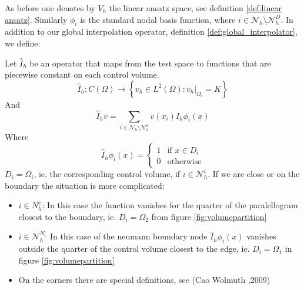 \documentclass[../Main/main.tex]{subfiles}
\begin{document}
	\par 
	As before one denotes by $V_h$ the linear ansatz space, see definition \ref{def:linear ansatz}. Similarly $\phi_i$ is the standard nodal basis function, where $i \in \mathcal{N}_h \setminus \mathcal{N}_h^D$.
	In addition to our global interpolation operator, definition \ref{def:global_interpolator}, we define:
	\begin{definition}
		Let $\hat{I}_h$ be an operator that maps from the test space to functions that are piecewise constant on each control volume.
		\begin{equation*}
			\hat{I}_h:C(\Omega)\rightarrow \left \{ v_h \in L^2(\Omega):v_h|_{\Omega_i} = K \right \}
		\end{equation*}
		And
		\begin{equation*}
			\hat{I}_h v = \sum_{i\in \mathcal{N}_h\setminus\mathcal{N}_h^d}v(x_i)\hat{I}_h\phi_i(x)
		\end{equation*}
		Where
		\begin{equation}
			\hat{I}_h\phi_i(x)=\left\{\begin{matrix}
				1 & \text{if } x\in D_i\\ 
				0 & \text{otherwise}
			\end{matrix}\right.
		\end{equation}
		$D_i = \Omega_i$, ie. the corresponding control volume, if $i \in \mathcal{N}_h^i$. If we are close or on the boundary the situation is more complicated: 
		\begin{itemize}
			\item $i \in N_h^e$: In this case the function vanishes for the quarter of the paralellogram closest to the boundary, ie. $D_i = \Omega_2$ from figure \ref{fig:volumepartition}
			\item $i \in \mathcal{N}_h^{N_e}$ In this case of the neumann boundary node $	\hat{I}_h\phi_i(x)$ vanishes outside the quarter of the control volume closest to the edge, ie. $D_i = \Omega_1$ in figure \ref{fig:volumepartition}
			\item On the corners there are special definitions, see (Cao Wolmuth \cite{https://doi.org/10.1002/num.20525},2009)
		\end{itemize} 
	\end{definition}
	
\end{document}
